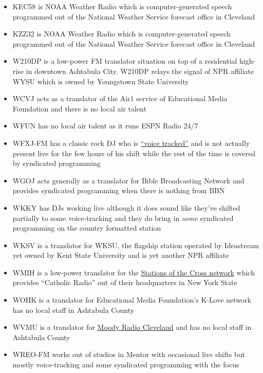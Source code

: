 \begin{itemize}
\tightlist
\item
  KEC58 is NOAA Weather Radio which is computer-generated speech
  programmed out of the National Weather Service forecast office in
  Cleveland
\item
  KZZ32 is NOAA Weather Radio which is computer-generated speech
  programmed out of the National Weather Service forecast office in
  Cleveland
\item
  W210DP is a low-power FM translator situation on top of a residential
  high-rise in downtown Ashtabula City. W210DP relays the signal of NPR
  affiliate WYSU which is owned by Youngstown State University
\item
  WCVJ acts as a translator of the Air1 service of Educational Media
  Foundation and there is no local air talent
\item
  WFUN has no local air talent as it runs ESPN Radio 24/7
\item
  WFXJ-FM has a classic rock DJ who is
  \href{https://en.wikipedia.org/wiki/Voice-tracking}{``voice tracked''}
  and is not actually present live for the few hours of his shift while
  the rest of the time is covered by syndicated programming
\item
  WGOJ acts generally as a translator for Bible Broadcasting Network and
  provides syndicated programming when there is nothing from BBN
\item
  WKKY has DJs working live although it does sound like they've shifted
  partially to some voice-tracking and they do bring in \emph{some}
  syndicated programming on the country formatted station
\item
  WKSV is a translator for WKSU, the flagship station operated by
  Ideastream yet owned by Kent State University and is yet another NPR
  affiliate
\item
  WMIH is a low-power translator for the
  \href{https://thestationofthecross.com/}{Stations of the Cross
  network} which provides ``Catholic Radio'' out of their headquarters
  in New York State
\item
  WOHK is a translator for Educational Media Foundation's K-Love network
  has no local staff in Ashtabula County
\item
  WVMU is a translator for
  \href{https://www.moodyradio.org/stations/cleveland}{Moody Radio
  Cleveland} and has no local staff in Ashtabula County
\item
  WREO-FM works out of studios in Mentor with occasional live shifts but
  mostly voice-tracking and some syndicated programming with the focus

\end{itemize}
